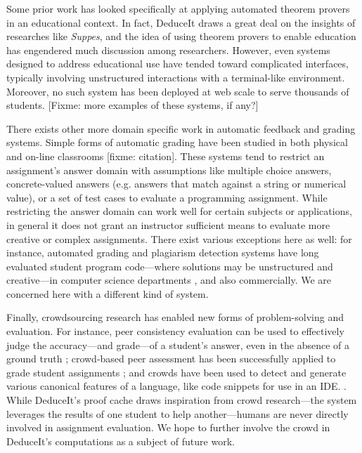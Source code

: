 \documentclass{sigchi}
\begin{document}
Some prior work has looked specifically at applying automated theorem provers in an educational context. \cite{suppes, suppes-prover} In fact, DeduceIt draws a great deal on the insights of researches like \textit{Suppes}, and the idea of using theorem provers to enable education has engendered much discussion among researchers. \cite{automated-grading, automated-scoring-design} However, even systems designed to address educational use have tended toward complicated interfaces, typically involving unstructured interactions with a terminal-like environment. Moreover, no such system has been deployed at web scale to serve thousands of students. [Fixme: more examples of these systems, if any?]

There exists other more domain specific work in automatic feedback and grading systems. Simple forms of automatic grading have been studied in both physical and on-line classrooms [fixme: citation]. These systems tend to restrict an assignment's answer domain with assumptions like multiple choice answers, concrete-valued answers (e.g. answers that match against a string or numerical value), or a set of test cases to evaluate a programming assignment. While restricting the answer domain can work well for certain subjects or applications, in general it does not grant an instructor sufficient means to evaluate more creative or complex assignments. There exist various exceptions here as well: for instance, automated grading and plagiarism detection systems have long evaluated student program code---where solutions may be unstructured and creative---in computer science departments \cite{grade-programs, moss}, and also commercially. We are concerned here with a different kind of system.

Finally, crowdsourcing research has enabled new forms of problem-solving and evaluation. For instance, peer consistency evaluation can be used to effectively judge the accuracy---and grade---of a student's answer, even in the absence of a ground truth \cite{peer-consistency}; crowd-based peer assessment has been successfully applied to grade student assignments \cite{peer-assessment}; and crowds have been used to detect and generate various canonical features of a language, like code snippets for use in an IDE. \cite{crowd-snippets}. While DeduceIt's proof cache draws inspiration from crowd research---the system leverages the results of one student to help another---humans are never directly involved in assignment evaluation. We hope to further involve the crowd in DeduceIt's computations as a subject of future work.
\end{document}
